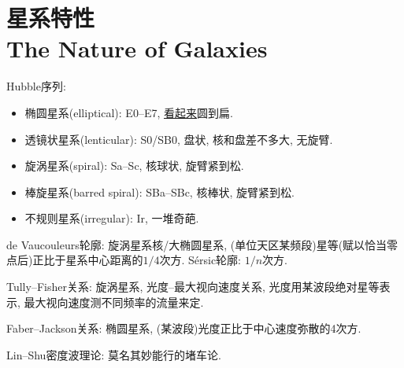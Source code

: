\chapter{星系特性\\The Nature of Galaxies}

Hubble序列:
\begin{itemize}
    \item 椭圆星系(elliptical): E0--E7, \underline{看起来}$\!\!$圆到扁.
    \item 透镜状星系(lenticular): S0/SB0, 盘状, 核和盘差不多大, 无旋臂.
    \item 旋涡星系(spiral): Sa--Sc, 核球状, 旋臂紧到松.
    \item 棒旋星系(barred spiral): SBa--SBc, 核棒状, 旋臂紧到松.
    \item 不规则星系(irregular): Ir, 一堆奇葩.
\end{itemize}

de Vaucouleurs轮廓: 旋涡星系核/大椭圆星系, (单位天区某频段)星等(赋以恰当零点后)正比于星系中心距离的$1/4$次方. S\'ersic轮廓: $1/n$次方.

Tully--Fisher关系: 旋涡星系, 光度--最大视向速度关系, 光度用某波段绝对星等表示, 最大视向速度测不同频率的流量来定.

Faber--Jackson关系: 椭圆星系, (某波段)光度正比于中心速度弥散的4次方.

Lin--Shu密度波理论: 莫名其妙能行的堵车论.
